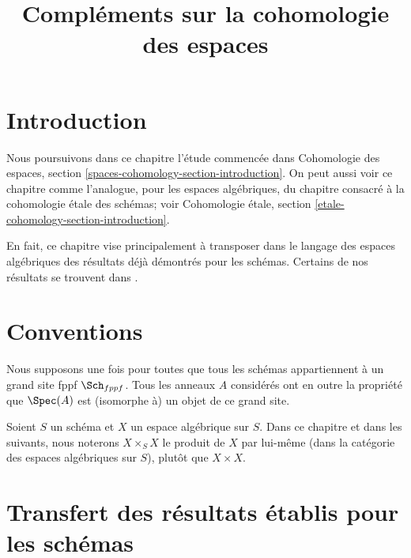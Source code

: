 

%


\title{Compléments sur la cohomologie des espaces}

\maketitle

\label{section-phantom}

\tableofcontents




\section{Introduction}
\label{section-introduction}

\noindent
Nous poursuivons dans ce chapitre l'étude commencée dans
Cohomologie des espaces, section \ref{spaces-cohomology-section-introduction}.
On peut aussi voir ce chapitre comme l'analogue, pour les espaces algébriques,
du chapitre consacré à la cohomologie étale des schémas; voir
Cohomologie étale, section \ref{etale-cohomology-section-introduction}.

\medskip\noindent
En fait, ce chapitre vise principalement à transposer dans le langage des
espaces algébriques des résultats déjà démontrés pour les schémas.
Certains de nos résultats se trouvent dans \cite{Kn}.





\section{Conventions}
\label{section-conventions}

\noindent
Nous supposons une fois pour toutes que tous les schémas appartiennent à
un grand site fppf $\Sch_{fppf}$. Tous les anneaux $A$ considérés
ont en outre la propriété que $\Spec(A)$ est (isomorphe à) un
objet de ce grand site.

\medskip\noindent
Soient $S$ un schéma et $X$ un espace algébrique sur $S$.
Dans ce chapitre et dans les suivants, nous noterons $X \times_S X$
le produit de $X$ par lui-même (dans la catégorie des espaces
algébriques sur $S$), plutôt que $X \times X$.







\section{Transfert des résultats établis pour les schémas}
\label{section-api}


